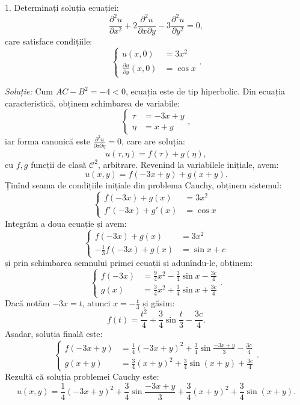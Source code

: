 \documentclass[11pt,a4paper]{article}
\newcommand\kal{\mathcal}
\theoremstyle{dotless}
\theoremstyle{dotlessdr}
\begin{document}
1. Determinați soluția ecuației:
\[
  \frac{\partial^2 u}{\partial x^2} + 2 \frac{\partial^2 u}{\partial x \partial y} - %
  3 \frac{\partial^2 u}{\partial y^2} = 0,
\]
care satisface condițiile:
\[
  \begin{cases}
    u(x, 0) &= 3x^2 \\
    \frac{\partial u}{\partial y}(x, 0) &= \cos x
  \end{cases}.
\]

\emph{Soluție:} Cum $ AC - B^2 = -4 < 0 $, ecuația este de tip hiperbolic.
Din ecuația caracteristică, obținem schimbarea de variabile:
\[
  \begin{cases}
    \tau &= -3x + y \\
    \eta &= x + y
  \end{cases},
\]
iar forma canonică este $ \frac{\partial^2 u}{\partial \tau\partial \eta} = 0 $,
care are soluția:
\[
  u(\tau, \eta) = f(\tau) + g(\eta),
\]
cu $ f, g $ funcții de clasă $ \kal{C}^2 $, arbitrare. Revenind la variabilele
inițiale, avem:
\[
  u(x, y) = f(-3x + y) + g(x + y).
\]
Ținînd seama de condițiile inițiale din problema Cauchy, obținem sistemul:
\[
  \begin{cases}
    f(-3x) + g(x) &= 3x^2 \\
    f'(-3x) + g'(x) &= \cos x
  \end{cases}
\]
Integrăm a doua ecuație și avem:
\[
  \begin{cases}
    f(-3x) + g(x) &= 3x^2 \\
    -\frac{1}{3}f(-3x) + g(x) &= \sin x + c
  \end{cases}
\]
și prin schimbarea semnului primei ecuații și adunîndu-le, obținem:
\[
  \begin{cases}
    f(-3x) &= \frac{9}{4} x^2 - \frac{3}{4} \sin x - \frac{3c}{4} \\
    g(x) &= \frac{3}{4} x^2 + \frac{3}{4} \sin x + \frac{3c}{4}
  \end{cases}.
\]
Dacă notăm $ -3x = t $, atunci $ x = -\frac{t}{3} $ și găsim:
\[
  f(t) = \frac{t^2}{4} + \frac{3}{4} \sin \frac{t}{3} - \frac{3c}{4}.
\]
Așadar, soluția finală este:
\[
  \begin{cases}
    f(-3x + y) &= \frac{1}{4}(-3x + y)^2 + \frac{3}{4} \sin \frac{-3x + y}{3} - \frac{3c}{4} \\
    g(x + y)   &= \frac{3}{4}(x + y)^2 + \frac{3}{4} \sin(x + y) + \frac{3c}{4}
  \end{cases}.
\]
Rezultă că soluția problemei Cauchy este:
\[
  u(x, y) = \frac{1}{4}(-3x + y)^2 + \frac{3}{4} \sin \frac{-3x + y}{3} + %
  \frac{3}{4}(x + y)^2 + \frac{3}{4} \sin(x + y).
\]
\end{document}
